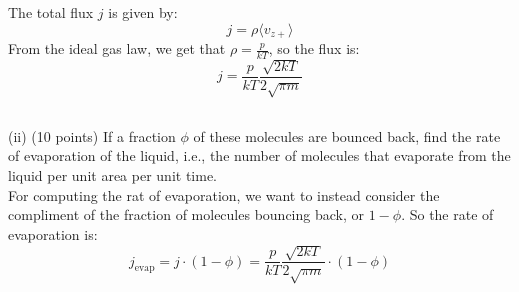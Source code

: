 \documentclass[12pt]{article}
\begin{document}
The total flux $j$ is given by:
\begin{equation}
j = \rho \langle v_{z+} \rangle
\end{equation}
From the ideal gas law, we get that $\rho = \frac{p}{kT}$, so the flux is:
\begin{equation}
j = \frac{p}{kT} \frac{\sqrt{2kT}}{2 \sqrt{\pi m}}
\end{equation}
\subsection{}
(ii) (10 points) If a fraction $\phi$ of these molecules are bounced back, find the rate of evaporation of the liquid, i.e., the number of molecules that evaporate from the liquid per unit area per unit time.\\
For computing the rat of evaporation, we want to instead consider the compliment of the fraction of molecules bouncing back, or $1-\phi$. So the rate of evaporation is:
\begin{equation}
j_{\text{evap}} = j \cdot (1-\phi) = \frac{p}{kT} \frac{\sqrt{2kT}}{2 \sqrt{\pi m}} \cdot (1-\phi)
\end{equation}
\end{document}
